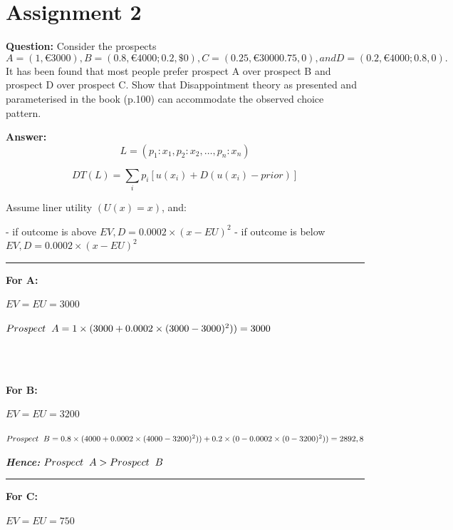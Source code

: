 \documentclass{article}
\begin{document}
\section{Assignment 2}
\textbf{Question:}
Consider the prospects
\begin{equation}
A = (1, €3000), B = (0.8, €4000; 0.2, \$0), C = (0.25, €3000 0.75, 0), and D = (0.2, €4000; 0.8, 0).
\end{equation}
It has been found that most people prefer prospect A over prospect B and prospect D over prospect C. Show that Disappointment theory
as presented and parameterised in the book (p.100) can accommodate the observed choice pattern. 

\textbf{Answer:}
\begin{equation}
L = (p_1: x_1, p_2: x_2, \ldots , p_n: x_n )
\end{equation}

\begin{equation}
DT(L) = \sum_i p_i [u(x_i) + D(u(x_i)- prior)]
\end{equation}

Assume liner utility $(U(x) = x)$, and:

- if outcome is above $EV, D=0.0002\times(x-EU)^2$
- if outcome is below $EV, D=0.0002\times(x-EU)^2$


\rule{\textwidth}{1pt}

\begin{flushleft}
\textbf{For A:}
\end{flushleft}
$EV=EU=3000$

$Prospect \hspace{2mm} A = 1 \times (3000 + 0.0002 \times (3000 - 3000)^2)) = 3000$

\\
\\

\begin{flushleft}
\color{red}
\textbf{For B:}
\end{flushleft}
$EV=EU=3200$

$Prospect \hspace{2mm} B = 0.8 \times (4000 + 0.0002 \times (4000 - 3200)^2)) + 0.2 \times (0 - 0.0002 \times (0 - 3200)^2)) = 2892,8$

\textbf{\textit{Hence:}} $Prospect \hspace{2mm} A > Prospect \hspace{2mm} B$

\rule{\textwidth}{1pt}

\begin{flushleft}
\textbf{For C:}
\end{flushleft}
$EV=EU=750$
\end{document}
